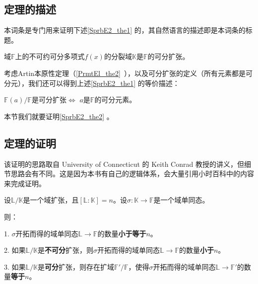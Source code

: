 

\subsection{定理的描述}

本词条是专门用来证明下述\autoref{SprbE2_the1} 的，其自然语言的描述即是本词条的标题。

\begin{theorem}{}\label{SprbE2_the1}
域$\mathbb{F}$上的不可约可分多项式$f(x)$的分裂域$\mathbb{K}$是$\mathbb{F}$的可分扩张。
\end{theorem}

考虑Artin本原性定理（\autoref{PrmtEl_the2}~），以及可分扩张的定义（所有元素都是可分元），我们还可以得到上述\autoref{SprbE2_the1} 的等价描述：

\begin{theorem}{}\label{SprbE2_the2}
$\mathbb{F}(a)/\mathbb{F}$是可分扩张$\iff$ $a$是$\mathbb{F}$的可分元素。
\end{theorem}

本节我们就要证明\autoref{SprbE2_the2} 。



\subsection{定理的证明}
该证明的思路取自 University of Connecticut 的 Keith Conrad 教授的讲义，但细节思路会有不同。这是因为本书有自己的逻辑体系，会大量引用小时百科中的内容来完成证明。

\begin{lemma}{}\label{SprbE2_lem1}
设$\mathbb{L}/\mathbb{K}$是一个域扩张，且$[\mathbb{L}:\mathbb{K}]=n$。设$\sigma:\mathbb{K}\to\mathbb{F}$是一个域单同态。

则：

1. $\sigma$开拓而得的域单同态$\mathbb{L}\to\mathbb{F}$的数量\textbf{小于等于}$n$。

2. 如果$\mathbb{L}/\mathbb{K}$是\textbf{不可分}扩张，则$\sigma$开拓而得的域单同态$\mathbb{L}\to\mathbb{F}$的数量\textbf{小于}$n$。

3. 如果$\mathbb{L}/\mathbb{K}$是\textbf{可分}扩张，则存在扩域$\mathbb{F}'/\mathbb{F}$，使得$\sigma$开拓而得的域单同态$\mathbb{L}\to\mathbb{F}'$的数量\textbf{等于}$n$。

\end{lemma}


